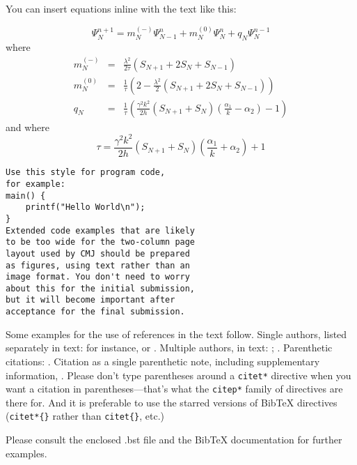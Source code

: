 \documentclass[letterpaper, 12pt]{article}
\begin{document}
You can insert equations inline with the text like this:

\begin{equation}
	\label{radupdate}
		\Psi_{N}^{n+1} = m_{N}^{(-)}\Psi_{N-1}^{n}+m_{N}^{(0)}\Psi_{N}^{n} + q_{N}\Psi_{N}^{n-1}
\end{equation}
where
\begin{eqnarray*}
	m_{N}^{(-)} &=& \frac{\lambda^2}{2\tau}\left(S_{N+1}+2S_{N}+S_{N-1}\right)\\
	m_{N}^{(0)} &=& \frac{1}{\tau}\left(2-\frac{\lambda^2}{2}\left(S_{N+1}+2S_{N}+S_{N-1}\right)\right)\\
	q_{N} &=& \frac{1}{\tau}\left(\frac{\gamma^2 k^2}{2h}\left(S_{N+1}+S_{N}\right)\left(\frac{\alpha_{1}}{k}-	\alpha_{2}\right)-1\right)
\end{eqnarray*}
and where 
\begin{equation*}
	\tau = \frac{\gamma^2 k^2}{2h}\left(S_{N+1}+S_{N}\right)\left(\frac{\alpha_{1}}{k}+\alpha_{2}\right)+1
\end{equation*}

%
\begin{Verbatim}[fontfamily=courier, xleftmargin=\parindent]
Use this style for program code, 
for example:
main() {
    printf("Hello World\n");    
}
Extended code examples that are likely
to be too wide for the two-column page
layout used by CMJ should be prepared
as figures, using text rather than an
image format. You don't need to worry
about this for the initial submission, 
but it will become important after 
acceptance for the final submission.
\end{Verbatim}

Some examples for the use of references in the text follow.
Single authors, listed separately in text: for instance, \citet*{Ano08} or \citet*{Bele68}.
Multiple authors, in text: \citet*{VeRo00}; \citet*{AtDa04}.
Parenthetic citations: \citep*{AtDa04, Ther99}.
Citation as a single parenthetic note, including supplementary information, \citep*[see also][which includes detailed diagrams]{Zica02}.
Please don't type parentheses around a \texttt{citet*{}} directive when you want a citation in parentheses---that's what the \texttt{citep*{}} family of directives are there for.
And it is preferable to use the starred versions of BibTeX directives (\texttt{citet*\{\}} rather than \texttt{citet\{\}}, etc.)

Please consult the enclosed .bst file and the BibTeX documentation for further examples. 




\end{document}
